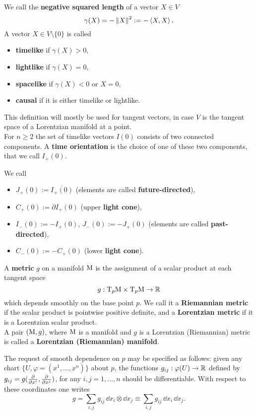 \begin{definition} We call the \textbf{negative squared length} of a vector $X\in V$
	\[\gamma(X)=-\displaystyle \left \| X \right \|^2:=-\left\langle X, X \right\rangle. \]
	A vector $X\in V\setminus\{0\}$ is called
\begin{itemize}
	\item  \textbf{timelike} if $\gamma(X)>0$,
	\item \textbf{lightlike} if $\gamma(X)=0$,
	\item \textbf{spacelike} if $\gamma(X)<0$ or $X=0$,
	\item \textbf{causal} if it is either timelike or lightlike.
	\end{itemize}
\label{defn:gamma}
	\end{definition}
\noindent 	This definition will mostly be used for tangent vectors, in case $V$ is the tangent space of a Lorentzian manifold at a point.\\
	For $n\geq 2$ the set of timelike vectors $I(0)$ consists of two connected components. A \textbf{time orientation} is the choice of one of these two components, that we call $I_+(0)$.

	\begin{definition}	We call
	\begin{itemize}
		\item $J_+(0):=\overline{I_+(0)}$ (elements are called \textbf{future-directed}),
		\item $C_+(0):=\partial I_+(0)$ (upper \textbf{light cone}),
		\item $I_-(0):=-I_+(0)$, $J_-(0):=-J_+(0)$ (elements are called \textbf{past-directed}),
		\item $C_-(0):=-C_+(0)$ (lower \textbf{light cone}).
	\end{itemize}
	\end{definition}

	


\begin{definition}
	A \textbf{metric} $g$ on a manifold $\mathrm{M}$ is the assignment of a scalar product at each tangent space $$g:\mathrm{T}_p\mathrm{M}\times\mathrm{T}_p\mathrm{M}\to{\mathbb R}$$ which depends smoothly on the base point $p$. We call it a \textbf{Riemannian metric} if the scalar product is pointwise positive definite, and a \textbf{Lorentzian metric} if it is a Lorentzian scalar product.\\
	A pair $(\mathrm{M},g)$, where $\mathrm{M}$ is a manifold and $g$ is a Lorentzian (Riemannian) metric is called a \textbf{Lorentzian (Riemannian) manifold}.
\end{definition}
\noindent The request of smooth dependence on $p$ may be specified as follows: given any chart $\{U,\varphi=(x^1,\dots,x^n)\}$ about $p$, the functions $g_{ij}:\varphi(U)\to{\mathbb R}$ defined by $g_{ij}=g(\frac{\partial  }{\partial x^i},\frac{\partial  }{\partial x^j})$, for any $i,j=1,\dots,n$ should be differentiable. With respect to these coordinates one writes
\[ g=\sum_{i,j} g_{ij}\,\dd x_i\otimes \dd x_j\equiv\sum_{i,j}g_{ij}\,\dd x_i\, \dd x_j. \]

